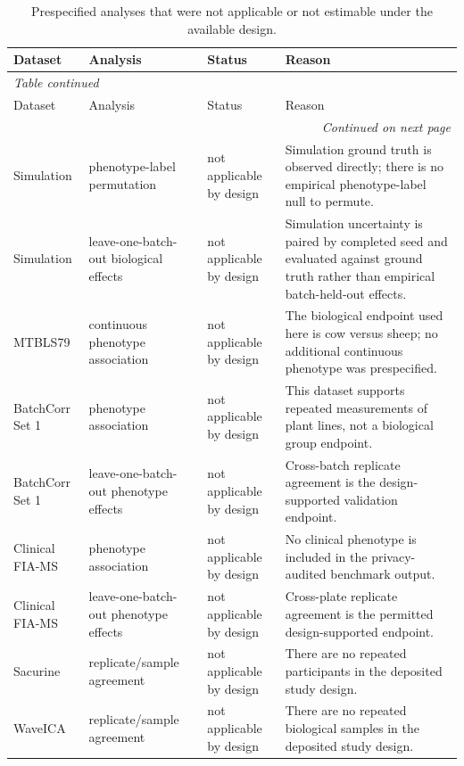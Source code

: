 \begin{landscape}
\tiny
\begin{longtable}{lllp{8cm}}
\caption{Prespecified analyses that were not applicable or not estimable under the available design.}\label{tab:supp_nonestimable}\\
\toprule
Dataset & Analysis & Status & Reason \\
\midrule
\endfirsthead
\multicolumn{4}{l}{\textit{Table \thetable{} continued}}\\
\toprule
Dataset & Analysis & Status & Reason \\
\midrule
\endhead
\midrule
\multicolumn{4}{r}{\textit{Continued on next page}}\\
\endfoot
\bottomrule
\endlastfoot
Simulation & phenotype-label permutation & not applicable by design & Simulation ground truth is observed directly; there is no empirical phenotype-label null to permute. \\
Simulation & leave-one-batch-out biological effects & not applicable by design & Simulation uncertainty is paired by completed seed and evaluated against ground truth rather than empirical batch-held-out effects. \\
MTBLS79 & continuous phenotype association & not applicable by design & The biological endpoint used here is cow versus sheep; no additional continuous phenotype was prespecified. \\
BatchCorr Set 1 & phenotype association & not applicable by design & This dataset supports repeated measurements of plant lines, not a biological group endpoint. \\
BatchCorr Set 1 & leave-one-batch-out phenotype effects & not applicable by design & Cross-batch replicate agreement is the design-supported validation endpoint. \\
Clinical FIA-MS & phenotype association & not applicable by design & No clinical phenotype is included in the privacy-audited benchmark output. \\
Clinical FIA-MS & leave-one-batch-out phenotype effects & not applicable by design & Cross-plate replicate agreement is the permitted design-supported endpoint. \\
Sacurine & replicate/sample agreement & not applicable by design & There are no repeated participants in the deposited study design. \\
WaveICA & replicate/sample agreement & not applicable by design & There are no repeated biological samples in the deposited study design. \\
\end{longtable}
\end{landscape}
